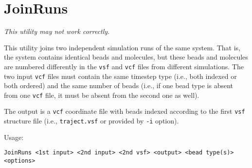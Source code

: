 \section{JoinRuns} \label{sec:JoinRuns}

{\it This utility may not work correctly.}

This utility joins two independent simulation runs of the same system.
That is, the system contains identical beads and molecules, but these beads
and molecules are numbered differently in the \texttt{vsf} and \texttt{vcf}
files from different simulations. The two input \texttt{vcf} files must
contain the same timestep type (i.e., both indexed or both ordered) and the
same number of beads (i.e., if one bead type is absent from one
\texttt{vcf} file, it must be absent from the second one as well).

The output is a \texttt{vcf} coordinate file with beads indexed according
to the first \texttt{vsf} structure file (i.e., \texttt{traject.vsf} or
provided by \texttt{-i} option).

Usage:

\vspace{1em}
\noindent
\texttt{JoinRuns <1st input> <2nd input> <2nd vsf> <output> <bead type(s)> \\ <options>}

